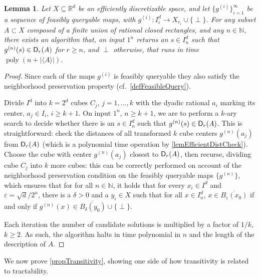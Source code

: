 \documentclass{amsart}
\theoremstyle{theorem}
\newtheorem{lemma}[theorem]{Lemma}
\theoremstyle{remark}
\numberwithin{equation}{section}
\DeclareMathOperator{\poly}{poly}
\newcommand{\NN}{\mathbb{N}}
\newcommand{\RR}{\mathbb{R}}
\newcommand{\ccD}{\textsf{\upshape D}}
\begin{document}
\begin{lemma}\label{lemEfficientSetDecidability}
Let $X \subseteq \RR^d$ be an efficiently discretizable space, and let $\{g^{(i)}\}_{i=1}^\infty$ be a sequence of feasibly queryable maps, with $g^{(i)}:I_i^d \rightarrow X_{r_i} \cup \{\perp\}$.
For any subset  $A \subset X$ composed of a finite union of rational closed rectangles, and any $n \in \NN$, there exists an algorithm that, on input $1^n$ returns an $s \in I_n^d$ such that $g^{(n)}(s) \in \ccD_{r}(A)$ for $r \geq n$, and $\perp$ otherwise, that runs in time $\poly(n+|\langle A\rangle |)$.
\end{lemma}
\begin{proof}
Since each of the maps $g^{(i)}$ is feasibly queryable they also satisfy the neighborhood preservation property (cf.\ \cref{defFeasibleQuery}).

Divide $I^d$ into $k=2^d$ cubes $C_j$, $j=1,\dots,k$ with the dyadic rational $a_i$ marking its center, $a_j \in I_i$, $i\geq k+1$.
On input $1^n$, $n \geq k+1$, we are to perform a $k$-ary search to decide whether there is an $s \in I^d_n$ such that $g^{(n)}(s) \in \ccD_{r}(A)$. This is straightforward: check the distances of all transformed $k$ cube centers $g^{(n)}(a_j)$ from $\ccD_{r}(A)$ (which is a polynomial time operation by \cref{lemEfficientDistCheck}). Choose the cube with center $g^{(n)}(a_j)$ closest to $\ccD_r(A)$, then recurse, dividing cube $C_j$ into $k$ more cubes: this can be correctly performed on account of the neighborhood preservation condition on the feasibly queryable maps $\{g^{(n)}\}$, which ensures that for for all $n \in \NN$, it holds that for every $x_i \in I^d$ and $\varepsilon = \sqrt{d}/2^n$, there is a $\delta>0$ and a $y_i \in X$ such that for all $x \in I_n^d$, $x \in \overline{B_\varepsilon(x_0)}$ if and only if $g^{(n)}(x) \in \overline{B_\delta(y_0)} \cup \{\perp\}$.

Each iteration the number of candidate solutions is multiplied by a factor of $1/k$, $k \geq 2$. As such, the algorithm halts in time polynomial in $n$ and the length of the description of $A$.
\end{proof}

We now prove \cref{propTransitivity}, showing one side of how transitivity is related to tractability.
\end{document}
